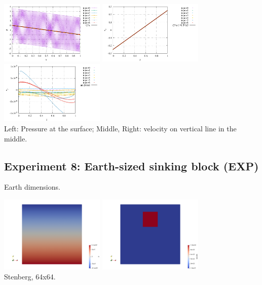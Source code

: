 \begin{center}
\includegraphics[width=5cm]{python_codes/fieldstone_78/results/pressure_top_exp7.pdf}
\includegraphics[width=5cm]{python_codes/fieldstone_78/results/vx_profile_exp7.pdf}
\includegraphics[width=5cm]{python_codes/fieldstone_78/results/vy_profile_exp7.pdf}\\
{\captionfont Left: Pressure at the surface; Middle, Right: velocity on vertical line in the middle.}
\end{center}




\newpage
\subsection*{Experiment 8: Earth-sized sinking block (EXP)}

Earth dimensions. 

\begin{center}
\includegraphics[width=5cm]{python_codes/fieldstone_78/results/exp08/p}
\includegraphics[width=5cm]{python_codes/fieldstone_78/results/exp08/eta}\\
{\captionfont Stenberg, 64x64.}
\end{center}


